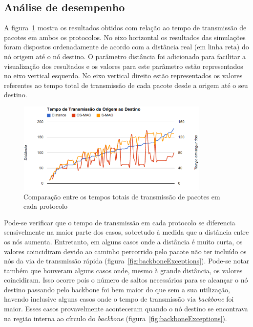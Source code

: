 \subsection{Análise de desempenho}

A figura~\ref{fig:transmissionTimeComparison} mostra os resultados obtidos com relação ao tempo de transmissão de pacotes em ambos os protocolos. No eixo horizontal os resultados das simulações foram dispostos ordenadamente de acordo com a distância real (em linha reta) do nó origem até o nó destino. O parâmetro distância foi adicionado para facilitar a visualização dos resultados e os valores para este parâmetro estão representados no eixo vertical esquerdo. No eixo vertical direito estão representados os valores referentes ao tempo total de transmissão de cada pacote desde a origem até o seu destino. 

\begin{figure}[!htb]
\centering
\includegraphics[width=360px,height=170px]{./Pictures/TransmissionTimeComparison.png}
\caption{Comparação entre os tempos totais de transmissão de pacotes em cada protocolo} %
\label{fig:transmissionTimeComparison} %
\end{figure}

Pode-se verificar que o tempo de transmissão em cada protocolo se diferencia sensivelmente na maior parte dos casos, sobretudo à medida que a distância entre os nós aumenta. Entretanto, em alguns casos onde a distância é muito curta, os valores coincidiram devido ao caminho percorrido pelo pacote não ter incluído os nós da via de transmissão rápida (figura~\ref{fig:backboneExceptions}). Pode-se notar também que houveram alguns casos onde, mesmo à grande distância, os valores coincidiram. Isso ocorre pois o número de saltos necessários para se alcançar o nó destino passando pelo backbone foi bem maior do que sem a sua utilização, havendo inclusive alguns casos onde o tempo de transmissão via \emph{backbone} foi maior. Esses casos provavelmente aconteceram quando o nó destino se encontrava na região interna ao círculo do \emph{backbone} (figura~\ref{fig:backboneExceptions}).

